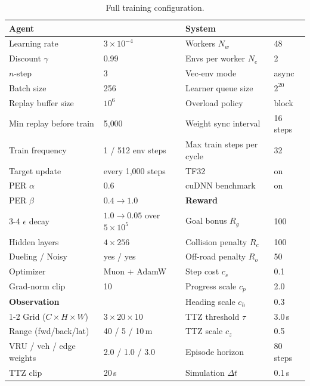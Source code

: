 \documentclass{article}
\begin{document}
\begin{table}[h]
\centering
\caption{Full training configuration.}
\label{tab:hyper}
\begin{tabular}{llll}
\toprule
\multicolumn{2}{l}{\textbf{Agent}} & \multicolumn{2}{l}{\textbf{System}} \\
\midrule
Learning rate            & $3 \times 10^{-4}$ & Workers $N_w$              & 48 \\
Discount $\gamma$        & 0.99               & Envs per worker $N_e$      & 2 \\
$n$-step                 & 3                  & Vec-env mode               & async \\
Batch size               & 256                & Learner queue size         & $2^{20}$ \\
Replay buffer size       & $10^6$             & Overload policy            & block \\
Min replay before train  & 5{,}000            & Weight sync interval       & 16 steps \\
Train frequency          & 1 / 512 env steps  & Max train steps per cycle  & 32 \\
Target update            & every 1{,}000 steps& TF32                       & on \\
PER $\alpha$             & 0.6                & cuDNN benchmark            & on \\
PER $\beta$              & $0.4 \to 1.0$      & \textbf{Reward}            & \\
\cmidrule(lr){3-4}
$\epsilon$ decay         & $1.0 \to 0.05$ over $5{\times}10^5$ & Goal bonus $R_g$ & 100 \\
Hidden layers            & $4 \times 256$     & Collision penalty $R_c$    & 100 \\
Dueling / Noisy          & yes / yes          & Off-road penalty $R_o$     & 50 \\
Optimizer                & Muon + AdamW       & Step cost $c_s$            & 0.1 \\
Grad-norm clip           & 10                 & Progress scale $c_p$       & 2.0 \\
\textbf{Observation}     &                    & Heading scale $c_h$        & 0.3 \\
\cmidrule(lr){1-2}
Grid ($C{\times}H{\times}W$) & $3 \times 20 \times 10$ & TTZ threshold $\tau$ & 3.0\,s \\
Range (fwd/back/lat)     & 40 / 5 / 10\,m     & TTZ scale $c_z$            & 0.5 \\
VRU / veh / edge weights & 2.0 / 1.0 / 3.0    & Episode horizon            & 80 steps \\
TTZ clip                 & 20\,s              & Simulation $\Delta t$      & 0.1\,s \\
\bottomrule
\end{tabular}
\end{table}
\end{document}
